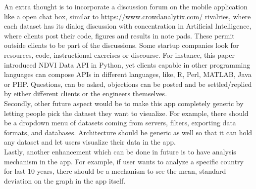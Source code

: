 An extra thought is to incorporate a discussion forum on the mobile application like a open chat box, similar to \url{https://www.crowdanalytix.com/} rivalries, where each dataset has its dialog discussion with concentration in Artificial Intelligence, where clients post their code, figures and results in note pads. These permit outside clients to be part of the discussions. Some startup companies look for resources, code, instructional exercises or discourse. For instance, this paper introduced NDVI Data API in Python, yet clients capable in other programming languages can compose APIs in different languages, like, R, Perl, MATLAB, Java or PHP. Questions, can be asked, objections can be posted and be settled/replied by either different clients or the engineers themselves. \\
Secondly, other future aspect would be to make this app completely generic by letting people pick the dataset they want to visualize. For example, there should be a dropdown menu of datasets coming from servers, filters, exporting data formats, and databases. Architecture should be generic as well so that it can hold any dataset and let users visualize their data in the app. \\
Lastly, another enhancement which can be done in future is to have analysis mechanism in the app. For example, if user wants to analyze a specific country for last 10 years, there should be a mechanism to see the mean, standard deviation on the graph in the app itself. 
